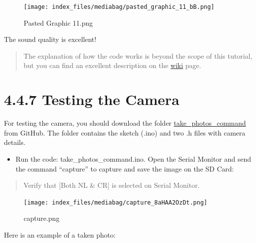 \documentclass[
  letterpaper,
  DIV=11,
  numbers=noendperiod]{scrreprt}
\providecommand{\tightlist}{%
  \setlength{\itemsep}{0pt}\setlength{\parskip}{0pt}}\usepackage{longtable,booktabs,array}
\begin{document}
\begin{figure}[H]

{\centering \texttt{[image: index\_files/mediabag/pasted\_graphic\_11\_bB.png]}

}

\caption{Pasted Graphic 11.png}

\end{figure}

The sound quality is excellent!

\begin{quote}
The explanation of how the code works is beyond the scope of this
tutorial, but you can find an excellent description on the
\href{https://wiki.seeedstudio.com/xiao_esp32s3_sense_mic\#save-recorded-sound-to-microsd-card}{wiki}
page.
\end{quote}

\hypertarget{testing-the-camera-1}{%
\section*{4.4.7 Testing the Camera}\label{testing-the-camera-1}}


For testing the camera, you should download the folder
\href{https://github.com/Mjrovai/XIAO-ESP32S3-Sense/tree/main/take_photos_command}{take\_photos\_command}
from GitHub. The folder contains the sketch (.ino) and two .h files with
camera details.

\begin{itemize}
\tightlist
\item
  Run the code: take\_photos\_command.ino. Open the Serial Monitor and
  send the command ``capture'' to capture and save the image on the SD
  Card:
\end{itemize}

\begin{quote}
Verify that {[}Both NL \& CR{]} is selected on Serial Monitor.
\end{quote}

\begin{figure}[H]

{\centering \texttt{[image: index\_files/mediabag/capture\_8aHAA2OzDt.png]}

}

\caption{capture.png}

\end{figure}

Here is an example of a taken photo:
\end{document}
